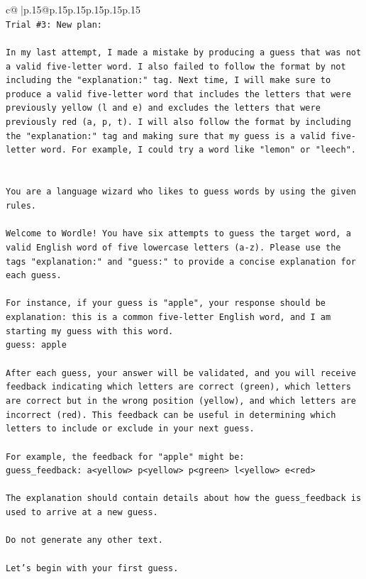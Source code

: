\documentclass{article}
\begin{document}
{\begin{supertabular}{c@{$\;$}|p{.15\linewidth}@{}p{.15\linewidth}p{.15\linewidth}p{.15\linewidth}p{.15\linewidth}p{.15\linewidth}}
{{{\\ 
\texttt{Trial \#3: New plan: } \\
\\ 
\texttt{In my last attempt, I made a mistake by producing a guess that was not a valid five{-}letter word. I also failed to follow the format by not including the "explanation:" tag. Next time, I will make sure to produce a valid five{-}letter word that includes the letters that were previously yellow (l and e) and excludes the letters that were previously red (a, p, t). I will also follow the format by including the "explanation:" tag and making sure that my guess is a valid five{-}letter word. For example, I could try a word like "lemon" or "leech".} \\
\\ 
\\ 
\texttt{You are a language wizard who likes to guess words by using the given rules.} \\
\\ 
\texttt{Welcome to Wordle! You have six attempts to guess the target word, a valid English word of five lowercase letters (a{-}z). Please use the tags "explanation:" and "guess:" to provide a concise explanation for each guess.} \\
\\ 
\texttt{For instance, if your guess is "apple", your response should be} \\
\texttt{explanation: this is a common five{-}letter English word, and I am starting my guess with this word.} \\
\texttt{guess: apple} \\
\\ 
\texttt{After each guess, your answer will be validated, and you will receive feedback indicating which letters are correct (green), which letters are correct but in the wrong position (yellow), and which letters are incorrect (red). This feedback can be useful in determining which letters to include or exclude in your next guess.} \\
\\ 
\texttt{For example, the feedback for "apple" might be:} \\
\texttt{guess\_feedback: a<yellow> p<yellow> p<green> l<yellow> e<red>} \\
\\ 
\texttt{The explanation should contain details about how the guess\_feedback is used to arrive at a new guess.} \\
\\ 
\texttt{Do not generate any other text.} \\
\\ 
\texttt{Let's begin with your first guess.} \\
            }
        }
    }
     \\ \\


\end{supertabular}}
\end{document}
